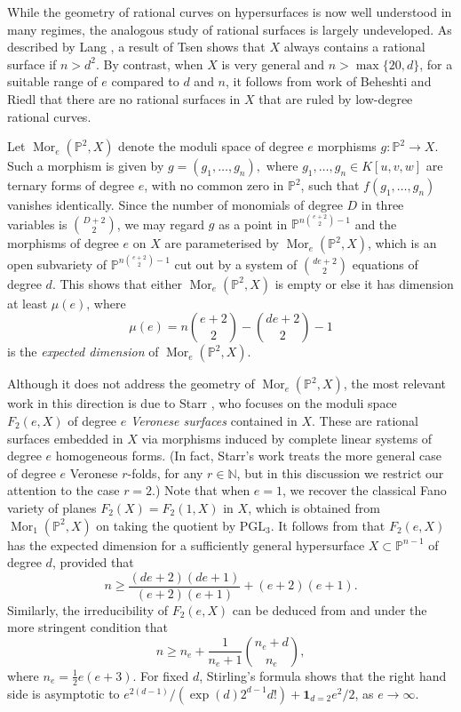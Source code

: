 \documentclass[12pt, reqno]{amsart}
\numberwithin{equation}{section}
\newcommand{\0}{\mathbf{0}}
\newcommand{\PP}{\mathbb{P}}
\newcommand{\NN}{\mathbb{N}}
\renewcommand{\geq}{\geqslant}
\def \Mor {\operatorname{Mor}}
\renewcommand{\=}{\equiv}
\newcommand{\1}{\mathbf{1}}
\theoremstyle{definition}
\begin{document}
While the geometry of rational curves on hypersurfaces is now well understood in many regimes, the analogous study of rational surfaces is  largely undeveloped.
As described by Lang \cite{lang},
a result of Tsen shows that $X$ always contains a rational surface
if $n> d^2$.
By contrast,
when $X$ is very general and $n> \max\{20,d\}$, for a suitable range of
 $e$ compared to  $d$ and $n$, it follows from work of
Beheshti  and Riedl \cite{roya'} that there are no
rational surfaces in $X$ that are ruled by low-degree rational curves.




Let $\Mor_e(\PP^2,X)$
denote the  moduli space
 of degree $e$ morphisms $g:\PP^2\to X$.
Such a morphism is given by
$
g=(g_1,\dots,g_n),
$
where $g_1,\dots,g_n\in K[u,v,w]$ are  ternary forms of degree $e$,
with no common zero in $\PP^2$, such that $f(g_1,\dots,g_n)$ vanishes  identically.
Since the number of monomials of degree $D$ in three variables is $\binom{D + 2}{2}$,
we may regard $g$ as a point in $\PP^{n \binom{e + 2}{2}-1}$ and
the morphisms of degree $e$ on $X$ are parameterised by
$\Mor_e(\PP^2,X)$, which is an open subvariety of
$\PP^{n \binom{e + 2}{2}-1}$ cut out by a system of $\binom{d e + 2}{2}$ equations of degree $d$.
This shows that 
either  $\Mor_e(\PP^2,X)$ is empty or else it has dimension at least $\mu(e)$,
where
\begin{equation}\label{eq:mu}
\mu(e) = n \binom{e + 2}{2}  -  \binom{d e + 2}{2} -1
\end{equation}
is the {\em expected dimension} of $\Mor_e(\PP^2,X)$. 

Although it does not address
the geometry of $\Mor_e(\PP^2,X)$, the most relevant work in this direction is due to Starr \cite{starr},
who focuses on the moduli space
$F_2(e,X)$ of degree $e$ {\em Veronese surfaces} contained in $X$. These are rational surfaces
embedded in $X$ via morphisms induced by complete linear systems of degree $e$ homogeneous forms.
(In fact, Starr's work treats the more general case of  degree $e$ Veronese $r$-folds, for any $r\in \NN$, but in this discussion we restrict our attention to the case $r=2$.)
Note that when $e = 1$, we recover the classical Fano variety of planes $F_2(X) = F_2(1, X)$  in $X$, which  is obtained from  $\Mor_1(\PP^2,X)$ on taking the quotient by $\mathrm{PGL}_{3}$.
It follows from \cite[Thm.~1.3]{starr} that $F_2(e,X)$ has the expected dimension for a sufficiently general hypersurface
$X\subset \PP^{n-1}$ of degree $d$, provided that
\begin{equation}
\label{starr1}
n\geq \frac{(de+2)(de+1)}{(e+2)(e+1)}+(e+2)(e+1).
\end{equation}
Similarly, the irreducibility of $F_2(e,X)$ can be deduced from \cite[Cor.~1.5]{starr} and \cite[Thm.~1.6(i)]{starr}
under the more stringent condition that
\begin{equation}\label{starr2}
n\geq n_e+\frac{1}{n_e+1}\binom{n_e+d}{n_e},
\end{equation}
where $n_e=\frac{1}{2}e(e+3)$.
For fixed $d$,  Stirling's formula shows that the right hand side is asymptotic to $e^{2(d-1)}/(\exp(d)2^{d-1}d!)+\mathbf{1}_{d=2}e^2/2$, as $e\to \infty$.
\end{document}
